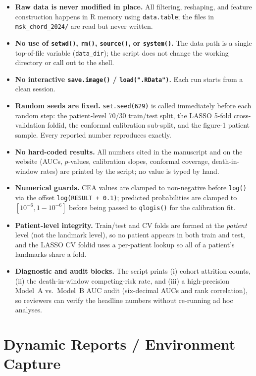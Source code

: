 \documentclass[11pt]{article}
\begin{document}
\begin{itemize}[leftmargin=*]
  \item \textbf{Raw data is never modified in place.} All filtering, reshaping, and feature construction happens in R memory using \texttt{data.table}; the files in \texttt{msk\_chord\_2024/} are read but never written.
  \item \textbf{No use of \texttt{setwd()}, \texttt{rm()}, \texttt{source()}, or \texttt{system()}.} The data path is a single top-of-file variable (\texttt{data\_dir}); the script does not change the working directory or call out to the shell.
  \item \textbf{No interactive \texttt{save.image()} / \texttt{load(".RData")}.} Each run starts from a clean session.
  \item \textbf{Random seeds are fixed.} \texttt{set.seed(629)} is called immediately before each random step: the patient-level 70/30 train/test split, the LASSO 5-fold cross-validation foldid, the conformal calibration sub-split, and the figure-1 patient sample. Every reported number reproduces exactly.
  \item \textbf{No hard-coded results.} All numbers cited in the manuscript and on the website (AUCs, $p$-values, calibration slopes, conformal coverage, death-in-window rates) are printed by the script; no value is typed by hand.
  \item \textbf{Numerical guards.} CEA values are clamped to non-negative before \texttt{log()} via the offset \texttt{log(RESULT + 0.1)}; predicted probabilities are clamped to $[10^{-6}, 1-10^{-6}]$ before being passed to \texttt{qlogis()} for the calibration fit.
  \item \textbf{Patient-level integrity.} Train/test and CV folds are formed at the \emph{patient} level (not the landmark level), so no patient appears in both train and test, and the LASSO CV foldid uses a per-patient lookup so all of a patient's landmarks share a fold.
  \item \textbf{Diagnostic and audit blocks.} The script prints (i) cohort attrition counts, (ii) the death-in-window competing-risk rate, and (iii) a high-precision Model~A vs.\ Model~B AUC audit (six-decimal AUCs and rank correlation), so reviewers can verify the headline numbers without re-running ad hoc analyses.
\end{itemize}

\section{Dynamic Reports / Environment Capture}
\end{document}
